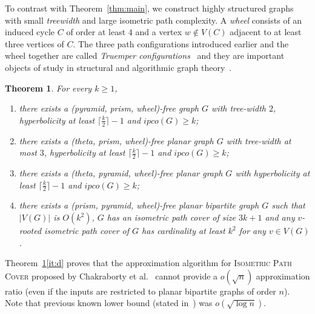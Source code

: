 \documentclass[a4paper]{article}
\newcommand{\ipco}[1]{ipco\left(#1\right)}
\newtheorem{theorem}{Theorem}
\begin{document}
To contrast with Theorem~\ref{thm:main}, we construct highly structured graphs with small \emph{treewidth} and large isometric path complexity. A \emph{wheel} consists of an induced cycle $C$ of order at least $4$ and a vertex $w \notin V(C)$ adjacent to at least three vertices of $C$. The three path configurations introduced earlier and the wheel together are called \emph{Truemper configurations}~\cite{vuskovic2013world} and they are important objects of study in structural and algorithmic graph theory~\cite{aboulker2015wheel,diot2020theta}. 


\begin{theorem}\label{thm:lower}
For every $k\geq 1$, 
\vspace{-7.5pt}
\begin{enumerate}[label=(\alph*)]
    \item\label{it:a} there exists a (pyramid, prism, wheel)-free graph $G$ with tree-width $2$, hyperbolicity at least $\lceil\frac{k}{2}\rceil-1$ and $\ipco{G}\geq k$;
    \item\label{it:b} there exists a (theta, prism, wheel)-free planar graph $G$ with tree-width at most $3$, hyperbolicity at least $\lceil\frac{k}{2}\rceil-1$ and $\ipco{G}\geq k$;
    \item\label{it:c} there exists a (theta, pyramid, wheel)-free planar graph $G$ with hyperbolicity at least $\lceil\frac{k}{2}\rceil-1$ and $\ipco{G}\geq k$;
    \item \label{it:d} { there exists a (prism, pyramid, wheel)-free planar bipartite graph $G$ such that $|V(G)|$ is $O(k^2)$, $G$ has an isometric path cover of size $3k+1$ and any $v$-rooted isometric path cover of $G$ has cardinality at least $k^2$ for any $v\in V(G)$. }
\end{enumerate}
\end{theorem}

 {  
Theorem~\ref{thm:lower}\ref{it:d} proves that the approximation algorithm for \textsc{Isometric Path Cover} proposed by Chakraborty et al.~\cite{ChakrabortyD0FG22} cannot provide a $o(\sqrt{n})$ approximation ratio (even if the inputs are restricted to planar bipartite graphs of order $n$). Note that previous known lower bound (stated in~\cite{ChakrabortyD0FG22}) was $o(\sqrt{\log n})$.}

\smallskip

%
\end{document}
